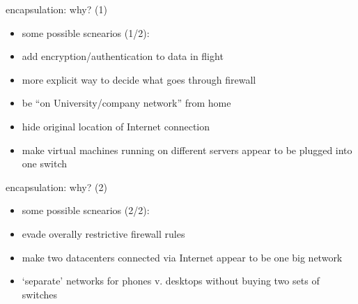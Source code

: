 \begin{frame}{encapsulation: why? (1)}
    \begin{itemize}
    \item some possible scnearios (1/2):
    \vspace{.5cm}
    \item add encryption/authentication to data in flight
    \item more explicit way to decide what goes through firewall
    \item be ``on University/company network'' from home
    \item hide original location of Internet connection
    \item make virtual machines running on different servers appear to be plugged into one switch
    \end{itemize}
\end{frame}

\begin{frame}{encapsulation: why? (2)}
    \begin{itemize}
    \item some possible scnearios (2/2):
    \vspace{.5cm}
    \item evade overally restrictive firewall rules
    \item make two datacenters connected via Internet appear to be one big network
    \item `separate' networks for phones v. desktops without buying two sets of switches
    \end{itemize}
\end{frame}

